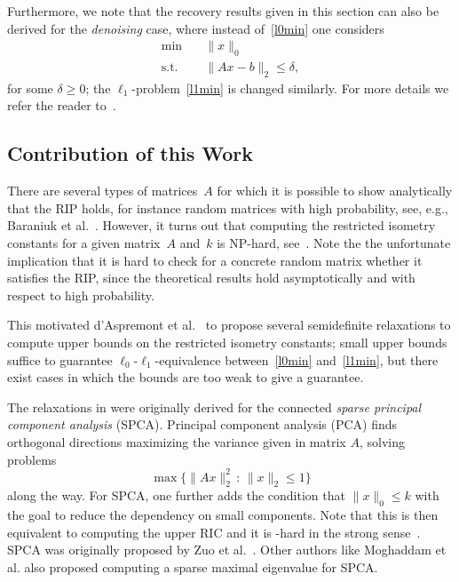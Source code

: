 \documentclass[journal]{IEEEtran}
\newcommand{\suchthat}{\,:\,}
\newcommand{\Norm}[2]{\lVert{#1}\rVert_{#2}}
\newcommand{\NP}{\text{NP}}
\begin{document}
Furthermore, we note that the recovery results given in this section can also be derived 
for the \emph{denoising} case, where instead of~\eqref{l0min} one considers
\begin{align}\label{l0minDenoising}
  \min \quad & \Norm{x}{0} \tag{$P_0^\delta$}\\
  \text{s.t.} \quad & \Norm{Ax - b}{2} \leq \delta, \nonumber
\end{align}
for some $\delta \geq 0$; the $\ell_1$-problem~\eqref{l1min} is changed
similarly. For more details we refer the reader to~\cite{FouR13}.


\subsection{Contribution of this Work}

\noindent
There are several types of matrices~$A$ for which it is possible
to show analytically that the RIP holds, for instance random
matrices with high probability, see, e.g., Baraniuk et al.~\cite{BDDW08}.
However, it turns out that computing the restricted isometry
constants for a given matrix~$A$ and~$k$ is NP-hard, see~\cite{PT14}. 
Note the the unfortunate implication that it is hard to check for a
concrete random matrix whether it satisfies the RIP, since the theoretical
results hold asymptotically and with respect to high probability.

This motivated d'Aspremont et al.~\cite{Asp08,Asp07} to propose several
semidefinite relaxations to compute upper bounds on the restricted isometry
constants; small upper bounds suffice to guarantee
$\ell_0$-$\ell_1$-equivalence between~\eqref{l0min} and~\eqref{l1min}, but
there exist cases in which the bounds are too weak to give a guarantee.

The relaxations in \cite{Asp08,Asp07} were originally derived for the
connected \emph{sparse principal component analysis} (SPCA). Principal
component analysis (PCA) finds orthogonal directions maximizing the 
variance given in matrix $A$, solving problems
\[
\max \{ \Norm{A x}{2}^2 \suchthat \Norm{x}{2} \leq 1\}
\]
along the way. For SPCA, one further adds the condition that $\Norm{x}{0}
\leq k$ with the goal to reduce the dependency on small components. Note
that this is then equivalent to computing the upper RIC and it is \NP-hard
in the strong sense~\cite{PT14}. SPCA was
originally proposed by Zuo et al.~\cite{SPCA}. Other authors like Moghaddam et al.
\cite{sbSPCA} also proposed computing a sparse maximal eigenvalue for SPCA.
\end{document}
